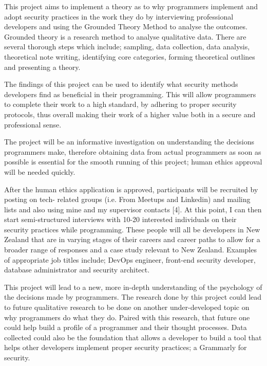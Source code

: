 \par This project aims to implement a theory as to why programmers implement and adopt security practices in the work they do by interviewing professional developers and using the Grounded Theory Method to analyse the outcomes. Grounded theory is a research method to analyse qualitative data. There are several thorough steps which include; sampling, data collection, data analysis, theoretical note writing, identifying core categories, forming theoretical outlines and presenting a theory.
\newline
\par The findings of this project can be used to identify what security methods developers find as beneficial in their programming. This will allow programmers to complete their work to a high standard, by adhering to proper security protocols, thus overall making their work of a higher value both in a secure and professional sense.
\newline
\par The project will be an informative investigation on understanding the decisions programmers make, therefore obtaining data from actual programmers as soon as possible is essential for the smooth running of this project; human ethics approval will be needed quickly.
\newline
\par After the human ethics application is approved, participants will be recruited by posting on tech- related groups (i.e. From Meetups and Linkedin) and mailing lists and also using mine and my supervisor contacts [4]. At this point, I can then start semi-structured interviews with 10-20 interested individuals on their security practices while programming. These people will all be developers in New Zealand that are in varying stages of their careers and career paths to allow for a broader range of responses and a case study relevant to New Zealand. Examples of appropriate job titles include; DevOps engineer, front-end security developer, database administrator and security architect.
\newline
\par This project will lead to a new, more in-depth understanding of the psychology of the decisions made by programmers. The research done by this project could lead to future qualitative research to be done on another under-developed topic on why programmers do what they do. Paired with this research, that future one could help build a profile of a programmer and their thought processes. Data collected could also be the foundation that allows a developer to build a tool that helps other developers implement proper security practices; a Grammarly for security.